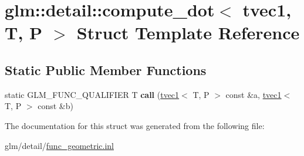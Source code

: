 \hypertarget{structglm_1_1detail_1_1compute__dot_3_01tvec1_00_01T_00_01P_01_4}{\section{glm\-:\-:detail\-:\-:compute\-\_\-dot$<$ tvec1, T, P $>$ Struct Template Reference}
\label{structglm_1_1detail_1_1compute__dot_3_01tvec1_00_01T_00_01P_01_4}
}
\subsection*{Static Public Member Functions}
\begin{DoxyCompactItemize}
\item 
\hypertarget{structglm_1_1detail_1_1compute__dot_3_01tvec1_00_01T_00_01P_01_4_a5d60ac85933e9dca62ed99875ec17f11}{static G\-L\-M\-\_\-\-F\-U\-N\-C\-\_\-\-Q\-U\-A\-L\-I\-F\-I\-E\-R T {\bfseries call} (\hyperlink{structglm_1_1tvec1}{tvec1}$<$ T, P $>$ const \&a, \hyperlink{structglm_1_1tvec1}{tvec1}$<$ T, P $>$ const \&b)}\label{structglm_1_1detail_1_1compute__dot_3_01tvec1_00_01T_00_01P_01_4_a5d60ac85933e9dca62ed99875ec17f11}

\end{DoxyCompactItemize}


The documentation for this struct was generated from the following file\-:\begin{DoxyCompactItemize}
\item 
glm/detail/\hyperlink{func__geometric_8inl}{func\-\_\-geometric.\-inl}\end{DoxyCompactItemize}
